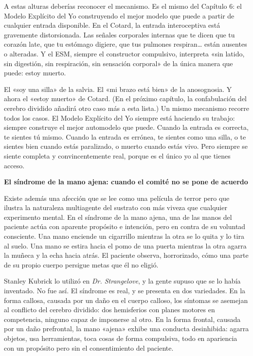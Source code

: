 \documentclass[11pt, twoside, openright]{book}
\begin{document}
A estas alturas deberías reconocer el mecanismo. Es el mismo del Capítulo 6: el Modelo Explícito del Yo construyendo el mejor modelo que puede a partir de cualquier entrada disponible. En el Cotard, la entrada interoceptiva está gravemente distorsionada. Las señales corporales internas que te dicen que tu corazón late, que tu estómago digiere, que tus pulmones respiran\ldots{} están ausentes o alteradas. Y el ESM, siempre el constructor compulsivo, interpreta «sin latido, sin digestión, sin respiración, sin sensación corporal» de la única manera que puede: estoy muerto.

El «soy una silla» de la salvia. El «mi brazo está bien» de la anosognosia. Y ahora el «estoy muerto» de Cotard. (En el próximo capítulo, la confabulación del cerebro dividido añadirá otro caso más a esta lista.) Un mismo mecanismo recorre todos los casos. El Modelo Explícito del Yo siempre está haciendo su trabajo: siempre construye el mejor automodelo que puede. Cuando la entrada es correcta, te sientes tú mismo. Cuando la entrada es errónea, te sientes como una silla, o te sientes bien cuando estás paralizado, o muerto cuando estás vivo. Pero siempre se siente completa y convincentemente real, porque es el único yo al que tienes acceso.

\textbf{El síndrome de la mano ajena: cuando el comité no se pone de acuerdo}

Existe además una afección que se lee como una película de terror pero que ilustra la naturaleza multiagente del sustrato con más viveza que cualquier experimento mental. En el síndrome de la mano ajena, una de las manos del paciente actúa con aparente propósito e intención, pero en contra de su voluntad consciente. Una mano enciende un cigarrillo mientras la otra se lo quita y lo tira al suelo. Una mano se estira hacia el pomo de una puerta mientras la otra agarra la muñeca y la echa hacia atrás. El paciente observa, horrorizado, cómo una parte de su propio cuerpo persigue metas que él no eligió.

Stanley Kubrick lo utilizó en \textit{Dr. Strangelove}, y la gente supuso que se lo había inventado. No fue así. El síndrome es real, y se presenta en dos variedades. En la forma callosa, causada por un daño en el cuerpo calloso, los síntomas se asemejan al conflicto del cerebro dividido: dos hemisferios con planes motores en competencia, ninguno capaz de imponerse al otro. En la forma frontal, causada por un daño prefrontal, la mano «ajena» exhibe una conducta desinhibida: agarra objetos, usa herramientas, toca cosas de forma compulsiva, todo en apariencia con un propósito pero sin el consentimiento del paciente.
\end{document}
